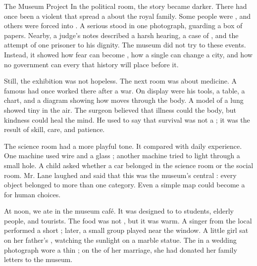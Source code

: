 \documentclass[12pt]{nextbook}
\begin{document}
\begin{readersection}{The Museum Project}
In the political room, the story became darker. There had once been a violent  that spread a  about the royal family. Some people were , and others were forced into . A serious  stood in one photograph, guarding a box of  papers. Nearby, a judge’s notes described a harsh  hearing, a case of , and the attempt of one prisoner to  his dignity. The museum did not try to  these events. Instead, it showed how fear can become , how a single  can change a city, and how no government can  every  that history will place before it.

Still, the exhibition was not hopeless. The next room was about medicine. A famous  had once worked there after a war. On display were his  tools, a  table, a  chart, and a diagram showing how  moves through the body. A model of a lung showed tiny  in the air. The surgeon believed that illness could  the body, but kindness could heal the mind. He used to say that survival was not a ; it was the result of skill, care, and patience.

The science room had a more playful tone. It compared  with daily experience. One machine used  wire and a glass ; another machine tried to  light through a small hole. A child asked whether a  car belonged in the science room or the social room. Mr. Lane laughed and said that this was the museum’s central : every object belonged to more than one category. Even a simple map could become a  for human choices.

At noon, we ate in the museum café. It was designed to  to students, elderly people, and tourists. The food was not , but it was warm. A singer from the local  performed a short ; later, a small  group played near the window. A little girl sat on her father’s , watching the sunlight  on a marble statue. The  in a wedding photograph wore a thin ; on the  of her marriage, she had donated her family letters to the museum.


\end{readersection}
\end{document}
